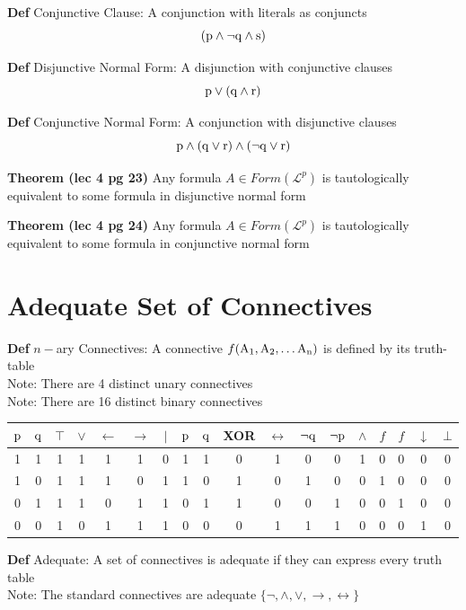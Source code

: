 \documentclass[11pt,notitlepage]{report}
\newcommand{\mc}[1]{\ensuremath{\mathcal{#1}}}
\begin{document}
\textbf{Def} Conjunctive Clause: A conjunction with literals as conjuncts
$$(\rm p \wedge \neg \rm q \wedge \rm s)$$

\textbf{Def} Disjunctive Normal Form: A disjunction with conjunctive clauses
$$\rm p \vee (\rm q \wedge \rm r)$$

\textbf{Def} Conjunctive Normal Form: A conjunction with disjunctive clauses
$$\rm p \wedge (\rm q \vee \rm r) \wedge (\neg \rm q \vee \rm r)$$

\textbf{Theorem (lec 4 pg 23)} Any formula $A \in Form(\mc L^p)$ is tautologically equivalent to some formula in disjunctive normal form

\textbf{Theorem (lec 4 pg 24)} Any formula $A \in Form(\mc L^p)$ is tautologically equivalent to some formula in conjunctive normal form


\section{Adequate Set of Connectives}

\textbf{Def} $n-$ary Connectives: A connective $f(\rm A_1, \rm A_2, \dots \rm A_n)$ is defined by its truth-table\\
\hspace*{5mm} Note: There are 4 distinct unary connectives\\
\hspace*{5mm} Note: There are 16 distinct binary connectives

\begin{center}
\begin{tabular}{ |c|c || c|c|c|c|c|c|c|c|c|c|c|c|c|c|c|c| } 
 \hline
 $\rm p$ & $\rm q$ & $\top$ & $\vee$ & $\leftarrow$ & $\to$ & $\mid$ & $\rm p$ & $\rm q$ & XOR & $\leftrightarrow$ & $\neg \rm q$ & $\neg \rm p$ & $\wedge$ & $f$ & $f$ & $\downarrow$ & $\bot$ \\ 
 \hline
 1 & 1 & 1 & 1 & 1 & 1 & 0 & 1 & 1 & 0 & 1 & 0 & 0 & 1 & 0 & 0 & 0 & 0 \\ 
 1 & 0 & 1 & 1 & 1 & 0 & 1 & 1 & 0 & 1 & 0 & 1 & 0 & 0 & 1 & 0 & 0 & 0 \\ 
 0 & 1 & 1 & 1 & 0 & 1 & 1 & 0 & 1 & 1 & 0 & 0 & 1 & 0 & 0 & 1 & 0 & 0 \\ 
 0 & 0 & 1 & 0 & 1 & 1 & 1 & 0 & 0 & 0 & 1 & 1 & 1 & 0 & 0 & 0 & 1 & 0 \\ 
 \hline
\end{tabular}
\end{center}

\textbf{Def} Adequate: A set of connectives is adequate if they can express every truth table\\
\hspace*{5mm} Note: The standard connectives are adequate $\{\neg, \wedge, \vee, \to, \leftrightarrow\}$
\end{document}
